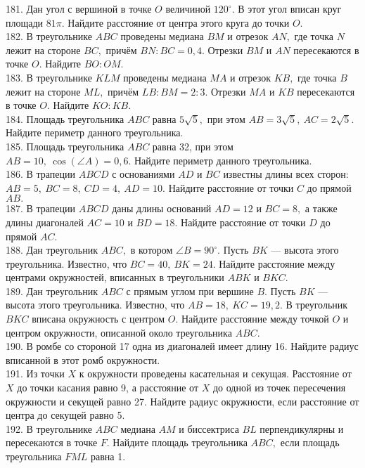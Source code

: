 181. Дан угол с вершиной в точке $O$ величиной $120^\circ.$ В этот угол вписан круг площади $81\pi.$ Найдите расстояние от центра этого круга до точки $O.$\\
182. В треугольнике $ABC$ проведены медиана $BM$ и отрезок $AN,$ где точка $N$ лежит на стороне $BC,$ причём $BN:BC=0,4.$ Отрезки $BM$ и $AN$ пересекаются в точке $O.$ Найдите $BO:OM.$\\
183. В треугольнике $KLM$ проведены медиана $MA$ и отрезок $KB,$ где точка $B$ лежит на стороне $ML,$ причём $LB:BM=2:3.$ Отрезки $MA$ и $KB$ пересекаются в точке $O.$ Найдите $KO:KB.$\\
184. Площадь треугольника $ABC$ равна $5\sqrt{5},$ при этом $AB=3\sqrt{5},\ AC=2\sqrt{5}.$ Найдите периметр данного треугольника.\\
185. Площадь треугольника $ABC$ равна 32, при этом $AB=10,\ \cos(\angle A)=0,6.$ Найдите периметр данного треугольника.\\
186. В трапеции $ABCD$ с основаниями $AD$ и $BC$ известны длины всех сторон: $AB=5,\ BC=8,\ CD=4,\ AD=10.$ Найдите расстояние от точки $C$ до прямой $AB.$\\
187. В трапеции $ABCD$ даны длины оснований $AD=12$ и $BC=8,$ а также длины диагоналей $AC=10$ и $BD=18.$ Найдите расстояние от точки $D$ до прямой $AC.$\\
188. Дан треугольник $ABC,$ в котором $\angle B=90^\circ.$ Пусть $BK$ --- высота этого треугольника. Известно, что $BC=40,\ BK=24.$ Найдите расстояние между центрами окружностей, вписанных в треугольники $ABK$ и $BKC.$\\
189. Дан треугольник $ABC$ с прямым углом при вершине $B.$ Пусть $BK$ --- высота этого треугольника. Известно, что $AB=18,\ KC=19,2.$ В треугольник $BKC$ вписана окружность с центром $O.$ Найдите расстояние между точкой $O$ и центром окружности, описанной около треугольника $ABC.$\\
190. В ромбе со стороной 17 одна из диагоналей имеет длину 16. Найдите радиус вписанной в этот ромб окружности.\\
191. Из точки $X$ к окружности проведены касательная и секущая. Расстояние от $X$ до точки касания равно 9, а расстояние от $X$ до одной из точек пересечения окружности и секущей равно 27. Найдите радиус окружности, если расстояние от центра до секущей равно 5.\\
192. В треугольнике $ABC$ медиана $AM$ и биссектриса $BL$ перпендикулярны и пересекаются в точке $F.$ Найдите площадь треугольника $ABC,$ если площадь треугольника $FML$ равна 1.\\
